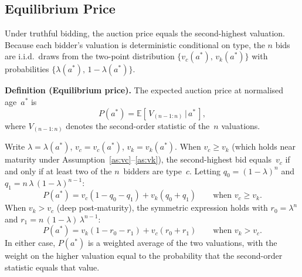 
\subsection{Equilibrium Price}
\label{sec:model:equil}

Under truthful bidding, the auction price equals the second-highest
valuation.  Because each bidder's valuation is deterministic
conditional on type, the $n$ bids are i.i.d.\ draws from the
two-point distribution
$\{v_{c}(a^{*}),\, v_{k}(a^{*})\}$ with probabilities
$\{\lambda(a^{*}),\, 1 - \lambda(a^{*})\}$.

\medskip

\noindent\textbf{Definition (Equilibrium price).}
The expected auction price at normalised age~$a^{*}$ is
\begin{equation}
  P(a^{*})
  = \mathbb{E}\!\left[\,V_{(n-1:n)} \,\big|\, a^{*}\,\right],
  \label{eq:price}
\end{equation}
where $V_{(n-1:n)}$ denotes the second-order statistic of the~$n$
valuations.

\medskip

Write $\lambda = \lambda(a^{*})$, $v_{c} = v_{c}(a^{*})$,
$v_{k} = v_{k}(a^{*})$.  When $v_{c} \geq v_{k}$ (which holds near
maturity under Assumption~\ref{as:vc}--\ref{as:vk}), the
second-highest bid equals~$v_{c}$ if and only if at least two of the
$n$~bidders are type~$c$.  Letting
$q_{0} = (1-\lambda)^{n}$ and
$q_{1} = n\,\lambda\,(1-\lambda)^{n-1}$:
\begin{equation}
  P(a^{*})
  = v_{c}\!\left(1 - q_{0} - q_{1}\right)
  + v_{k}\!\left(q_{0} + q_{1}\right)
  \qquad \text{when } v_{c} \geq v_{k}.
  \label{eq:price_vc_dom}
\end{equation}
When $v_{k} > v_{c}$ (deep post-maturity), the symmetric expression
holds with $r_{0} = \lambda^{n}$ and
$r_{1} = n\,(1-\lambda)\,\lambda^{n-1}$:
\begin{equation}
  P(a^{*})
  = v_{k}\!\left(1 - r_{0} - r_{1}\right)
  + v_{c}\!\left(r_{0} + r_{1}\right)
  \qquad \text{when } v_{k} > v_{c}.
  \label{eq:price_vk_dom}
\end{equation}
In either case, $P(a^{*})$ is a weighted average of the two
valuations, with the weight on the higher valuation equal to the
probability that the second-order statistic equals that value.


